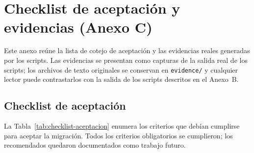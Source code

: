 
\section{Checklist de aceptación y evidencias (Anexo C)}

Este anexo reúne la lista de cotejo de aceptación y las evidencias reales
generadas por los scripts. Las evidencias se presentan como capturas de la
salida real de los scripts; los archivos de texto originales se conservan en
\texttt{evidence/} y cualquier lector puede contrastarlos con la salida de los
scripts descritos en el Anexo~B.

\subsection{Checklist de aceptación}

La Tabla~\ref{tab:checklist-aceptacion} enumera los criterios que debían
cumplirse para aceptar la migración. Todos los criterios obligatorios se
cumplieron; los recomendados quedaron documentados como trabajo futuro.

